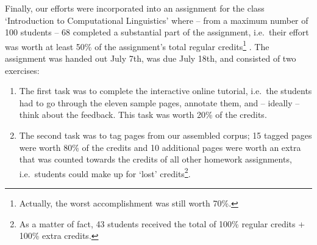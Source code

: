 \documentclass[12pt]{article}
\begin{document}
Finally, our efforts were incorporated into an assignment for the class `Introduction to Computational Linguistics' where -- from a maximum number of 100 students -- 68 completed a substantial part of the assignment, i.e.~their effort was worth at least 50\% of the assignment's total regular credits\footnote{Actually, the worst accomplishment was still worth 70\%.} .
The assignment was handed out July 7th, was due July 18th, and consisted of two exercises:
\begin{enumerate}
	\item The first task was to complete the interactive online tutorial, i.e.~the students had to go through the eleven sample pages, annotate them, and -- ideally -- think about the feedback. This task was worth 20\% of the credits.
	\item The second task was to tag pages from our assembled corpus; 15 tagged pages were worth 80\% of the credits and 10 additional pages were worth an extra that was counted towards the credits of all other homework assignments, i.e.~students could make up for `lost' credits\footnote{As a matter of fact, 43 students received the total of 100\% regular credits + 100\% extra credits.}.
\end{enumerate}



\end{document}
